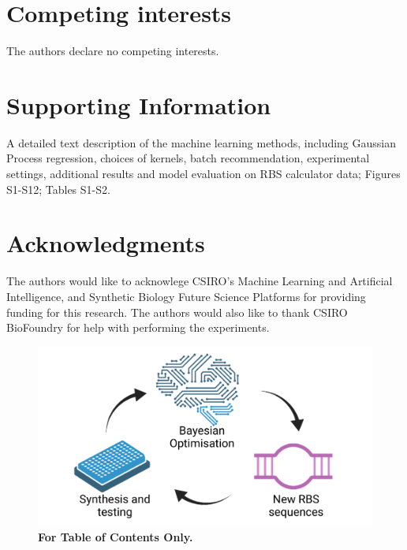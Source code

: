 \documentclass{scrartcl}[2013/05/29]%
\begin{document}
\section*{Competing interests}
The authors declare no competing interests.

\section*{Supporting Information}

A detailed text description of the machine learning methods, including Gaussian Process regression, choices of kernels, batch recommendation, experimental settings, additional results and model evaluation on RBS calculator data; Figures S1-S12; Tables S1-S2.


\section*{Acknowledgments}
The authors would like to acknowlege CSIRO's Machine Learning and Artificial Intelligence, and Synthetic Biology Future Science Platforms for providing funding for this research. The authors would also like to thank CSIRO BioFoundry for help with performing the experiments.


\newpage

\printbibliography

\newpage

\begin{figure}[h]
    \centering
    \includegraphics[scale=0.5]{paper/plots/Supplementary/TOC.pdf}
    \caption{\textbf{For Table of Contents Only.} }
    \label{fig: TOC}
\end{figure}

\clearpage

\setcounter{figure}{0}
\setcounter{table}{0}
\makeatletter
\renewcommand{\thefigure}{S\@arabic\c@figure}
\renewcommand{\thetable}{S\@arabic\c@table}
\makeatother
{}%
\renewcommand*{\thepage}{S\arabic{page}}
\appendix
\end{document}
